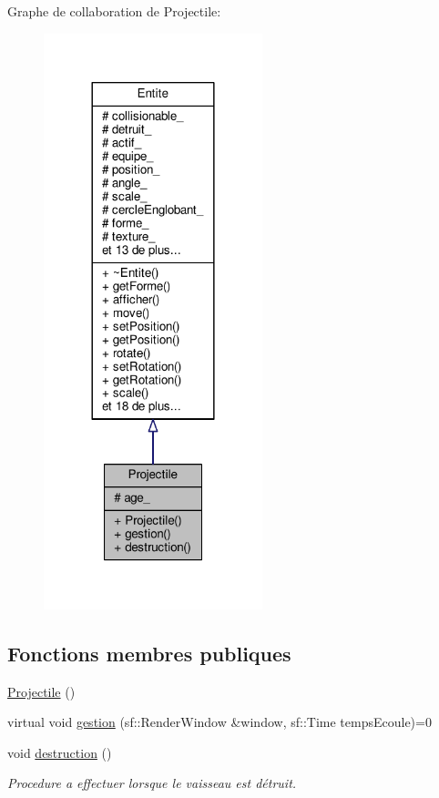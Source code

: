 Graphe de collaboration de Projectile\+:\nopagebreak
\begin{figure}[H]
\begin{center}
\leavevmode
\includegraphics[width=180pt]{class_projectile__coll__graph}
\end{center}
\end{figure}
\subsection*{Fonctions membres publiques}
\begin{DoxyCompactItemize}
\item 
\hyperlink{class_projectile_ac536ed2aad56af866a2078b9a85aa16d}{Projectile} ()
\item 
virtual void \hyperlink{class_projectile_a09e02b793473660fc59a329a4dfea0ec}{gestion} (sf\+::\+Render\+Window \&window, sf\+::\+Time temps\+Ecoule)=0
\item 
void \hyperlink{class_projectile_aac0afd5bf761f0e212d4e1c8a503c86a}{destruction} ()
\begin{DoxyCompactList}\small\item\em Procedure a effectuer lorsque le vaisseau est détruit. \end{DoxyCompactList}\end{DoxyCompactItemize}
